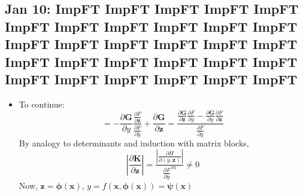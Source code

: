 \documentclass[10pt, oneside]{article}
\newcommand{\del}{\partial}
\renewcommand{\vec}[1]{\mathbf{#1}}
\newcommand{\vecf}[1]{\boldsymbol{#1}}
\begin{document}
\subsection{Jan 10: ImpFT ImpFT ImpFT ImpFT ImpFT ImpFT ImpFT ImpFT ImpFT ImpFT ImpFT ImpFT ImpFT ImpFT ImpFT ImpFT ImpFT ImpFT ImpFT ImpFT ImpFT ImpFT ImpFT ImpFT ImpFT ImpFT ImpFT ImpFT ImpFT}
\begin{itemize}
    \item To continue:
        \[= -\frac{\del \vecf{G}}{\del y} \frac{\frac{\del F}{\del \vec{z}}}{\frac{\del F}{\del y}} + \frac{\del \vecf{G}}{\del \vec{z}} = \frac{\frac{\del \vecf{G}}{\del \vec{z}} \frac{\del F}{\del y} - \frac{\del \vecf{G}}{\del y} \frac{\del F}{\del \vec{z}}}{\frac{\del F}{\del y}}\]
    By analogy to determinants and induction with matrix blocks,
    \[\left| \frac{\del \vecf{K}}{\del \vec{z}} \right| = \frac{\left| \frac{\del H}{\del (y,\vec{z})} \right|}{\frac{\del F}{\del y}^m} \neq 0\]
    Now, $\vec{z} = \vecf{\phi}(\vec{x})$, $y = f(\vec{x},\vecf{\phi}(\vec{x})) = \vecf{\psi} (\vec{x})$
\end{itemize}
\end{document}
